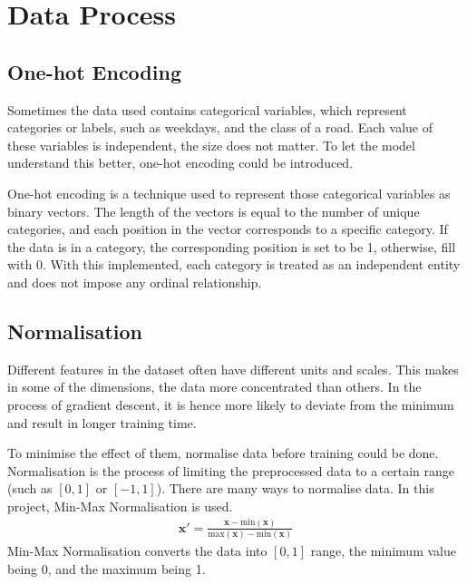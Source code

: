 \section{Data Process}

\subsection{One-hot Encoding}

Sometimes the data used contains categorical variables, which represent categories or labels, such as weekdays, and the class of a road.
Each value of these variables is independent, the size does not matter. To let the model understand this better, one-hot encoding could be introduced.

One-hot encoding is a technique used to represent those categorical variables as binary vectors. The length of the vectors is equal to the number of unique categories,
and each position in the vector corresponds to a specific category. If the data is in a category, the corresponding position is set to be 1, otherwise, fill with 0. 
With this implemented, each category is treated as an independent entity and does not impose any ordinal relationship. 

\subsection{Normalisation} \label{Section:Normalisation}

Different features in the dataset often have different units and scales. This makes in some of the dimensions, the data more concentrated than others. 
In the process of gradient descent, it is hence more likely to deviate from the minimum and result in longer training time.

To minimise the effect of them, normalise data before training could be done. 
Normalisation is the process of limiting the preprocessed data to a certain range (such as $[0, 1]$ or $[-1, 1]$).
There are many ways to normalise data. In this project, Min-Max Normalisation is used. 
\begin{gather}
    \mathbf{x}' = \frac{\mathbf{x}-\mathrm{min}(\mathbf{x})}{\mathrm{max}(\mathbf{x})-\mathrm{min}(\mathbf{x})}
\end{gather}
Min-Max Normalisation converts the data into $[0, 1]$ range, the minimum value being 0, and the maximum being 1.

